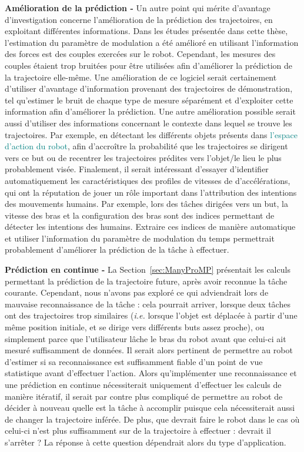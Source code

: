 \documentclass[utf8]{frontiersSCNS} %
\newcommand{\toimprove}[1]{\textcolor{teal}{#1}}
\begin{document}
\textbf{Amélioration de la prédiction -} Un autre point qui mérite d'avantage d'investigation concerne l'amélioration de la prédiction des trajectoires, en exploitant différentes informations. Dans les études présentée dans cette thèse, l'estimation du paramètre de modulation a été amélioré en utilisant l'information des forces est des couples exercées sur le robot. Cependant, les mesures des couples étaient trop bruitées pour être utilisées afin d'améliorer la prédiction de la trajectoire elle-même. Une amélioration de ce logiciel serait certainement d'utiliser d'avantage d'information provenant des trajectoires de démonstration, tel qu'estimer le bruit de chaque type de mesure séparément et d'exploiter cette information afin d'améliorer la prédiction.
Une autre amélioration possible serait aussi d'utiliser des informations concernant le contexte dans lequel se trouve les trajectoires. Par exemple, en détectant les différents objets présents dans \toimprove{l'espace d'action du robot}, afin d’accroître la probabilité que les trajectoires se dirigent vers ce but ou de recentrer les trajectoires prédites vers l'objet/le lieu le plus probablement visée. 
Finalement, il serait intéressant d'essayer d'identifier automatiquement les caractéristiques des profiles de vitesses de d’accélérations, qui ont la réputation de jouer un rôle important dans l'attribution des intentions des mouvements humains. Par exemple, lors des tâches dirigées vers un but, la vitesse des bras et la configuration des bras sont des indices permettant de détecter les intentions des humains. Extraire ces indices de manière automatique et utiliser l'information du paramètre de modulation du temps permettrait probablement d'améliorer la prédiction de la tâche à effectuer.

\textbf{Prédiction en continue -} La Section~\ref{sec:ManyProMP} présentait les calculs permettant la prédiction de la trajectoire future, après avoir reconnue la tâche courante. Cependant, nous n'avons pas exploré ce qui adviendrait lors de mauvaise reconnaissance de la tâche : cela pourrait arriver, lorsque deux tâches ont des trajectoires trop similaires (\textit{i.e.} lorsque l'objet est déplacée à partir d'une même position initiale, et se dirige vers différents buts assez proche), ou simplement parce que l'utilisateur lâche le bras du robot avant que celui-ci ait mesuré suffisamment de données. Il serait alors pertinent de permettre au robot d'estimer si sa reconnaissance est suffisamment fiable d'un point de vue statistique avant d'effectuer l'action. Alors qu'implémenter une reconnaissance et une prédiction en continue nécessiterait uniquement d'effectuer les calculs de manière itératif, il serait par contre plus compliqué de permettre au robot de décider à nouveau quelle est la tâche à accomplir puisque cela nécessiterait aussi de changer la trajectoire inférée. De plus, que devrait faire le robot dans le cas où celui-ci n'est plus suffisamment sur de la trajectoire à effectuer : devrait il s'arrêter ? La réponse à cette question dépendrait alors du type d'application.
\end{document}
